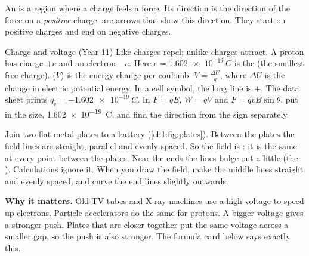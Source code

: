 An  is a region where a charge feels a force. Its direction
is the direction of the force on a \emph{positive} charge. 
are arrows that show this direction. They start on positive charges and end on
negative charges.

\begin{refresher}{Charge and voltage (Year 11)}
Like charges repel; unlike charges attract. A proton has charge $+e$ and an
electron $-e$. Here $e = \qty{1.602e-19}{C}$ is the 
(the smallest free charge).  ($V$) is the energy
change per coulomb: $V = \frac{\Delta U}{q}$, where $\Delta U$ is the change in
electric potential energy. In a cell symbol, the long line is $+$.
The data sheet prints $q_\mathrm{e} = \qty{-1.602e-19}{C}$. In $F = qE$,
$W = qV$ and $F = qvB\sin\theta$, put in the size, \qty{1.602e-19}{C}, and
find the direction from the sign separately.
\end{refresher}

Join two flat metal plates to a battery (\cref{ch1:fig:plates}). Between the
plates the field lines are straight, parallel and evenly spaced. So the field is
: it is the same at every point between the plates. Near the ends
the lines bulge out a little (the ). Calculations ignore it.
When you draw the field, make the middle lines straight and evenly spaced, and
curve the end lines slightly outwards.

\textbf{Why it matters.} Old TV tubes and X-ray machines use a high voltage
to speed up electrons. Particle accelerators do the same for
protons. A bigger voltage gives a stronger push. Plates that are closer together
put the same voltage across a smaller gap, so the push is also stronger. The
formula card below says exactly this.

